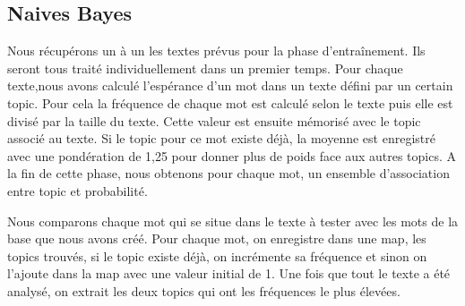 \subsection{Naives Bayes}


  Nous récupérons un à un les textes prévus pour la phase d'entraînement. Ils seront tous traité individuellement dans un premier temps. Pour chaque texte,nous avons calculé l'espérance d'un mot dans un texte défini par un certain topic. Pour cela la fréquence de chaque mot est calculé selon le texte puis elle est divisé par la taille du texte. Cette valeur est ensuite mémorisé avec le topic associé au texte. Si le topic pour ce mot existe déjà, la moyenne est enregistré avec une pondération de 1,25 pour donner plus de poids face aux autres topics. A la fin de cette phase, nous obtenons pour chaque mot, un ensemble d'association entre topic et probabilité. 


  Nous comparons chaque mot qui se situe dans le texte à tester avec les mots de la base que nous avons créé. Pour chaque mot, on enregistre dans une map, les topics trouvés, si le topic existe déjà, on incrémente sa fréquence et sinon on l'ajoute dans la map avec une valeur initial de 1. Une fois que tout le texte a été analysé, on extrait les deux topics qui ont les fréquences le plus élevées.

